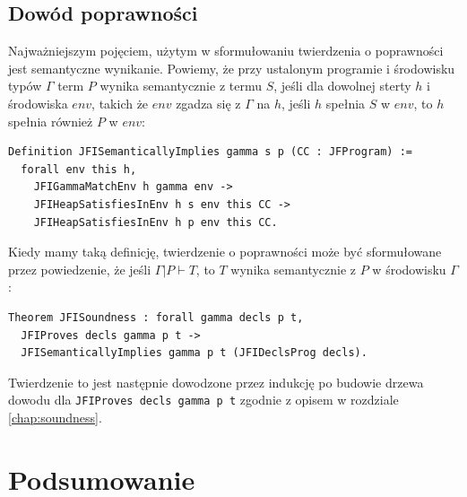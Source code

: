 \documentclass[]{pracamgr}
\renewcommand \| {\hspace{0.75em} | \hspace{0.75em} }
\renewcommand \[ {[\![}
\renewcommand \] {]\!]}
\theoremstyle{definition}
\begin{document}
\section{Dowód poprawności}
Najważniejszym pojęciem, użytym w sformułowaniu twierdzenia o poprawności
jest semantyczne wynikanie. Powiemy, że przy ustalonym programie
i środowisku typów $\Gamma$ term $P$ wynika semantycznie z termu $S$, jeśli
dla dowolnej sterty $h$ i środowiska $env$, takich że $env$ zgadza się z $\Gamma$ na $h$,
jeśli $h$ spełnia $S$ w $env$, to $h$ spełnia również $P$ w $env$:
\begin{verbatim}
Definition JFISemanticallyImplies gamma s p (CC : JFProgram) :=
  forall env this h,
    JFIGammaMatchEnv h gamma env ->
    JFIHeapSatisfiesInEnv h s env this CC ->
    JFIHeapSatisfiesInEnv h p env this CC. 
\end{verbatim}

Kiedy mamy taką definicję, twierdzenie o poprawności może być sformułowane
przez powiedzenie, że jeśli $\Gamma | P \vdash T$, to $T$ wynika semantycznie z $P$
w środowisku $\Gamma$ :
\begin{verbatim}
Theorem JFISoundness : forall gamma decls p t,
  JFIProves decls gamma p t ->
  JFISemanticallyImplies gamma p t (JFIDeclsProg decls). 
\end{verbatim}

Twierdzenie to jest następnie dowodzone przez indukcję po budowie drzewa dowodu
dla \texttt{JFIProves decls gamma p t} zgodnie z opisem w rozdziale \ref{chap:soundness}.

\chapter{Podsumowanie}
\end{document}
